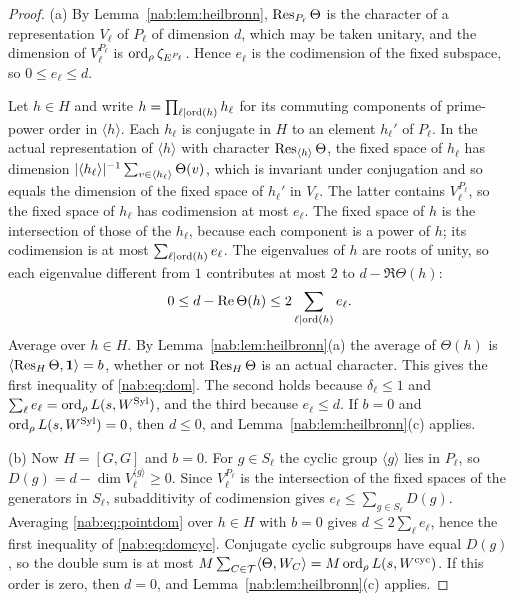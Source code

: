 \begin{proof}
(a) By Lemma~\ref{nab:lem:heilbronn}, $\operatorname{Res}_{P_\ell}\Theta$ is the character of a
representation $V_\ell$ of $P_\ell$ of dimension $d$, which may be taken unitary, and the
dimension of $V_\ell^{P_\ell}$ is $\operatorname{ord}_\rho\zeta_{E^{P_\ell}}$. Hence $e_\ell$ is the
codimension of the fixed subspace, so $0\le e_\ell\le d$.

Let $h\in H$ and write $h=\prod_{\ell\mid\operatorname{ord}(h)}h_\ell$ for its commuting components of
prime-power order in $\langle h\rangle$. Each $h_\ell$ is conjugate in $H$ to an element
$h_\ell'$ of $P_\ell$. In the actual representation of $\langle h\rangle$ with character
$\operatorname{Res}_{\langle h\rangle}\Theta$, the fixed space of $h_\ell$ has dimension
$\lvert\langle h_\ell\rangle\rvert^{-1}\sum_{v\in\langle h_\ell\rangle}\Theta(v)$, which is
invariant under conjugation and so equals the dimension of the fixed space of $h_\ell'$
in $V_\ell$. The latter contains $V_\ell^{P_\ell}$, so the fixed space of $h_\ell$ has
codimension at most $e_\ell$. The fixed space of $h$ is the intersection of those of the
$h_\ell$, because each component is a power of $h$; its codimension is at most
$\sum_{\ell\mid\operatorname{ord}(h)}e_\ell$. The eigenvalues of $h$ are roots of unity, so each
eigenvalue different from $1$ contributes at most $2$ to $d-\Re\Theta(h)$:
\begin{equation}\label{nab:eq:pointdom}
 0\le d-\operatorname{Re}\Theta(h)\le2\sum_{\ell\mid\operatorname{ord}(h)}e_\ell .
\end{equation}
Average over $h\in H$. By Lemma~\ref{nab:lem:heilbronn}(a) the average of $\Theta(h)$ is
$\langle\operatorname{Res}_H\Theta,\mathbf{1}\rangle=b$, whether or not $\operatorname{Res}_H\Theta$ is an actual
character. This gives the first inequality of \eqref{nab:eq:dom}. The second holds because
$\delta_\ell\le1$ and $\sum_\ell e_\ell=\operatorname{ord}_\rho L(s,W^{\mathrm{Syl}})$, and the third
because $e_\ell\le d$. If $b=0$ and $\operatorname{ord}_\rho L(s,W^{\mathrm{Syl}})=0$, then $d\le0$, and
Lemma~\ref{nab:lem:heilbronn}(c) applies.

(b) Now $H=[G,G]$ and $b=0$. For $g\in S_\ell$ the cyclic group $\langle g\rangle$ lies in
$P_\ell$, so $D(g)=d-\dim V_\ell^{\langle g\rangle}\ge0$. Since $V_\ell^{P_\ell}$ is the
intersection of the fixed spaces of the generators in $S_\ell$, subadditivity of
codimension gives $e_\ell\le\sum_{g\in S_\ell}D(g)$. Averaging \eqref{nab:eq:pointdom}
over $h\in H$ with $b=0$ gives $d\le2\sum_\ell e_\ell$, hence the first inequality of
\eqref{nab:eq:domcyc}. Conjugate cyclic subgroups have equal $D(g)$, so the double sum is at
most $M\sum_{C\in\mathcal T}\langle\Theta,W_C\rangle=M\operatorname{ord}_\rho L(s,W^{\mathrm{cyc}})$. If
this order is zero, then $d=0$, and Lemma~\ref{nab:lem:heilbronn}(c) applies.
\end{proof}

